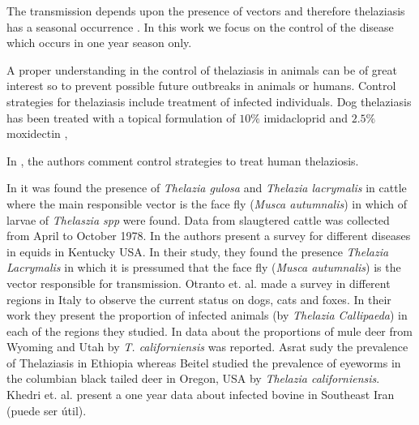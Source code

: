 \documentclass[preprint,12pt]{elsarticle}
\begin{document}
\noindent The transmission depends upon the presence of vectors and therefore thelaziasis has a seasonal occurrence \cite{Asrat:2016}. In this work we focus on the control of the disease which occurs in one year season only.

\noindent A proper understanding in the control of thelaziasis in animals can be of great interest so to prevent possible future outbreaks in animals or humans. Control strategies for thelaziasis include treatment of infected individuals. Dog thelaziasis has been treated with a topical formulation of $10\%$ imidacloprid and $2.5\%$ moxidectin \cite{Bianciardi:2005},


In \cite{shen:2006}, the authors comment control strategies to treat human thelaziosis.






\noindent In \cite{Moolenbeek:1980} it was found the presence of \textit{Thelazia gulosa} and \textit{Thelazia lacrymalis} in cattle where the main responsible vector is the face fly (\textit{Musca autumnalis}) in which of larvae of \textit{Thelaszia spp} were found. Data from slaugtered cattle was collected from April to October 1978. In \cite{Lyons:2000} the authors present a survey for different diseases in equids in Kentucky USA. In their study, they found the presence \textit{Thelazia Lacrymalis} in which it is pressumed that the face fly (\textit{Musca autumnalis}) is the vector responsible for transmission. Otranto et. al. \cite{Otranto:2003} made a survey in different regions in Italy to observe the current status on dogs, cats and foxes. In their work they present the proportion of infected animals (by \textit{Thelazia Callipaeda}) in each of the regions they studied. In \cite{Dubay:2000} data about the proportions of mule deer from Wyoming and Utah by \textit{T. californiensis} was reported. Asrat \cite{Asrat:2016} sudy the prevalence of Thelaziasis in Ethiopia whereas Beitel \cite{Beitel:1974} studied the prevalence of eyeworms in the columbian black tailed deer in Oregon, USA by \textit{Thelazia californiensis}. Khedri et. al. \cite{Khedri:2016} present a one year data about infected bovine in Southeast Iran (puede ser útil).
\end{document}
